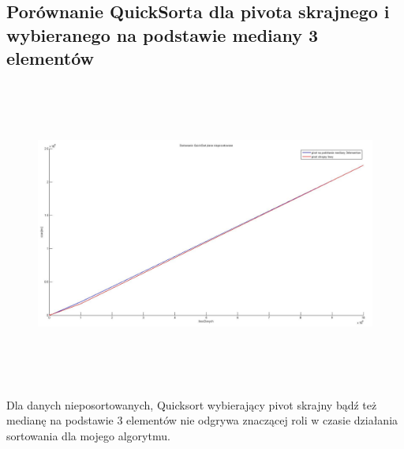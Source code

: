 \documentclass[a4paper,11pt]{article}
\begin{document}
\subsection{Porównanie QuickSorta dla pivota skrajnego i wybieranego na podstawie mediany 3 elementów}
\begin{center}
\begin{figure}[h!]
\includegraphics[width=12.5cm,height=10cm]{Wykresy2/QuickPivotyNieposortowany}
\label{fig:obrazek Wykresy2/QuickPivotyNieposortowany}
\end{figure}
\end{center}
Dla danych nieposortowanych, Quicksort wybierający pivot skrajny bądź też medianę na podstawie 3 elementów nie odgrywa znaczącej roli w czasie działania sortowania dla mojego algorytmu.
\newpage
\end{document}
